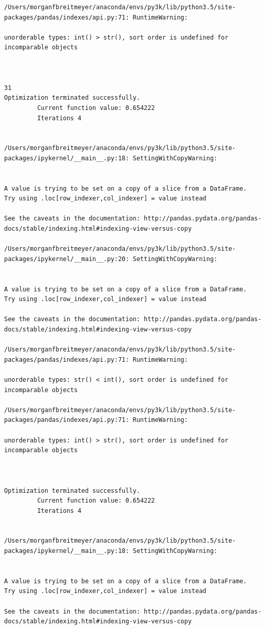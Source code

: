 \begin{lstlisting}
/Users/morganfbreitmeyer/anaconda/envs/py3k/lib/python3.5/site-packages/pandas/indexes/api.py:71: RuntimeWarning:

unorderable types: int() > str(), sort order is undefined for incomparable objects



31
Optimization terminated successfully.
         Current function value: 0.654222
         Iterations 4


/Users/morganfbreitmeyer/anaconda/envs/py3k/lib/python3.5/site-packages/ipykernel/__main__.py:18: SettingWithCopyWarning:


A value is trying to be set on a copy of a slice from a DataFrame.
Try using .loc[row_indexer,col_indexer] = value instead

See the caveats in the documentation: http://pandas.pydata.org/pandas-docs/stable/indexing.html#indexing-view-versus-copy

/Users/morganfbreitmeyer/anaconda/envs/py3k/lib/python3.5/site-packages/ipykernel/__main__.py:20: SettingWithCopyWarning:


A value is trying to be set on a copy of a slice from a DataFrame.
Try using .loc[row_indexer,col_indexer] = value instead

See the caveats in the documentation: http://pandas.pydata.org/pandas-docs/stable/indexing.html#indexing-view-versus-copy

/Users/morganfbreitmeyer/anaconda/envs/py3k/lib/python3.5/site-packages/pandas/indexes/api.py:71: RuntimeWarning:

unorderable types: str() < int(), sort order is undefined for incomparable objects

/Users/morganfbreitmeyer/anaconda/envs/py3k/lib/python3.5/site-packages/pandas/indexes/api.py:71: RuntimeWarning:

unorderable types: int() > str(), sort order is undefined for incomparable objects



Optimization terminated successfully.
         Current function value: 0.654222
         Iterations 4


/Users/morganfbreitmeyer/anaconda/envs/py3k/lib/python3.5/site-packages/ipykernel/__main__.py:18: SettingWithCopyWarning:


A value is trying to be set on a copy of a slice from a DataFrame.
Try using .loc[row_indexer,col_indexer] = value instead

See the caveats in the documentation: http://pandas.pydata.org/pandas-docs/stable/indexing.html#indexing-view-versus-copy


\end{lstlisting}
